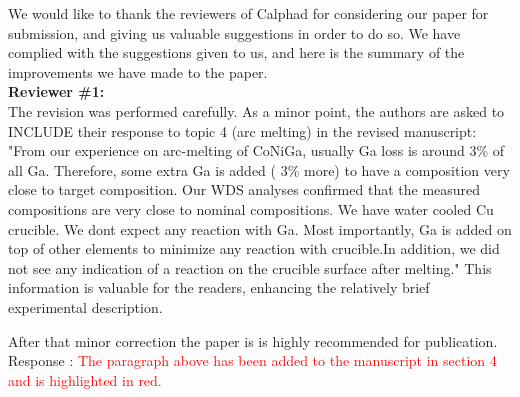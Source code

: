 \documentclass[12pt]{article}
\begin{document}
\begin{spacing}{1.24}

We would like to thank the reviewers of Calphad for considering our paper for submission, and giving us valuable suggestions in order to do so. We have complied with the suggestions given to us, and here is the summary of the improvements we have made to the paper.\\
\textbf{Reviewer \#1:} \\
The revision was performed carefully. As a minor point, the authors are asked to INCLUDE their response to topic 4 (arc melting) in the revised manuscript:
"From our experience on arc-melting of CoNiGa, usually Ga loss is around 3\% of all
Ga. Therefore, some extra Ga is added ( 3\% more) to have a composition very close
to target composition. Our WDS analyses confirmed that the measured compositions
are very close to nominal compositions. We have water cooled Cu crucible. We dont
expect any reaction with Ga. Most importantly, Ga is added on top of other elements
to minimize any reaction with crucible.In addition, we did not see any indication of
a reaction on the crucible surface after melting."
This information is valuable for the readers, enhancing the relatively brief experimental description. 

After that minor correction the paper is is highly recommended for publication. \\
Response : \textcolor{red}{ The paragraph above has been added to the manuscript in section 4 and is highlighted in red.}
\end{spacing}
\end{document}
